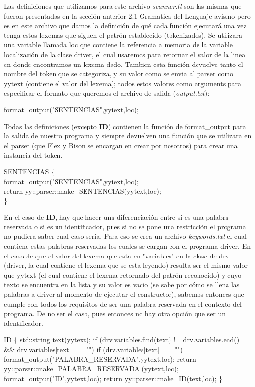 Las definiciones que utilizamos para este archivo \textit{scanner.ll} son las mismas que fueron presentadas en la sección anterior 2.1 Gramatica del Lenguaje avismo 
pero es en este archivo que damos la definición de qué cada función ejecutará una vez tenga estos lexemas que siguen el patrón establecido (tokenizados). Se utilizara 
una variable llamada loc que contiene la referencia a memoria de la variable localización de la clase driver, el cual usaremos para retornar el valor de la linea en 
donde encontramos un lexema dado. Tambien esta función devuelve tanto el nombre del token que se categoriza, y su valor como se envia al parser como yytext (contiene el valor del lexema); 
todos estos valores como arguments para especificar el formato que queremos el archivo de salida (\textit{output.txt}):


format\_output("SENTENCIAS",yytext,loc);


Todas las definiciones (excepto \textbf{ID}) contienen la función de format\_output para la salida de nuestro programa y siempre devuelven una función que se 
utilizara en el parser (que Flex y Bison se encargan en crear por nosotros) para crear una instancia del token.

{SENTENCIAS} \{\\
	\indent\indent format\_output("SENTENCIAS",yytext,loc);\\
	\indent\indent return yy::parser::make\_SENTENCIAS(yytext,loc);\\
    \indent \}

En el caso de \textbf{ID}, hay que hacer una diferenciación entre si es una palabra reservada o si es un identificador, pues si no se pone una restricción el programa 
no pudiera saber cual caso seria. Para eso se crea un archivo \textit{keywords.txt} el cual contiene estas palabras reservadas los cuales se cargan con el 
programa driver. En el caso de que el valor del lexema que esta en "variables" en la clase de drv (driver, la cual contiene el lexema que se esta leyendo) resulta ser 
el mismo valor que yytext (el cual contiene el lexema retornado del patrón reconocido) y cuyo texto se encuentra en la lista y su valor es vacio (se sabe por cómo se llena 
las palabras a driver al momento de ejecutar el constructor), sabemos entonces que cumple con todos los requisitos de ser una palabra reservada en el contexto del programa.
De no ser el caso, pues entonces no hay otra opción que ser un identificador.


{ID} \{	
  std::string text(yytext);
  if (drv.variables.find(text) != drv.variables.end() \&\& drv.variables[text] == "") {
    if (drv.variables[text] == "") {
      format\_output("PALABRA\_RESERVADA",yytext,loc);
      return yy::parser::make\_PALABRA\_RESERVADA (yytext,loc);
    }
  }
	format\_output("ID",yytext,loc);
	return yy::parser::make\_ID(text,loc);
\}